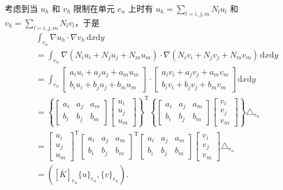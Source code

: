 考虑到当 $u_h$ 和 $v_h$ 限制在单元 $e_n$ 上时有 $u_h = \sum_{l=i,j,m} N_l u_l$ 和 $v_h = \sum_{l=i,j,m} N_l v_l$，于是
\begin{align*}
&\int_{e_n} \nabla u_h \cdot \nabla v_h \, \mathrm{d}x\mathrm{d}y \\
&= \int_{e_n} \nabla(N_i u_i + N_j u_j + N_m u_m) \cdot \nabla(N_i v_i + N_j v_j + N_m v_m) \, \mathrm{d}x\mathrm{d}y \\
&= \int_{e_n}
\begin{bmatrix}
a_i u_i + a_j u_j + a_m u_m \\
b_i u_i + b_j u_j + b_m u_m
\end{bmatrix}
\cdot
\begin{bmatrix}
a_i v_i + a_j v_j + a_m v_m \\
b_i v_i + b_j v_j + b_m v_m
\end{bmatrix}
\mathrm{d}x\mathrm{d}y \\
&= \left\{
\begin{bmatrix}
a_i & a_j & a_m \\
b_i & b_j & b_m
\end{bmatrix}
\begin{bmatrix}
u_i \\ u_j \\ u_m
\end{bmatrix}
\right\}^{\mathrm{T}}
\left\{
\begin{bmatrix}
a_i & a_j & a_m \\
b_i & b_j & b_m
\end{bmatrix}
\begin{bmatrix}
v_i \\ v_j \\ v_m
\end{bmatrix}
\right\}
\triangle_{e_n} \\
&=
\begin{bmatrix}
u_i \\ u_j \\ u_m
\end{bmatrix}^{\mathrm{T}}
\begin{bmatrix}
a_i & a_j & a_m \\
b_i & b_j & b_m
\end{bmatrix}^{\mathrm{T}}
\begin{bmatrix}
a_i & a_j & a_m \\
b_i & b_j & b_m
\end{bmatrix}
\begin{bmatrix}
v_i \\ v_j \\ v_m
\end{bmatrix}
\triangle_{e_n} \\
&= ([\bar{K}]_{e_n}\{u\}_{e_n}, \{v\}_{e_n}).
\end{align*}


